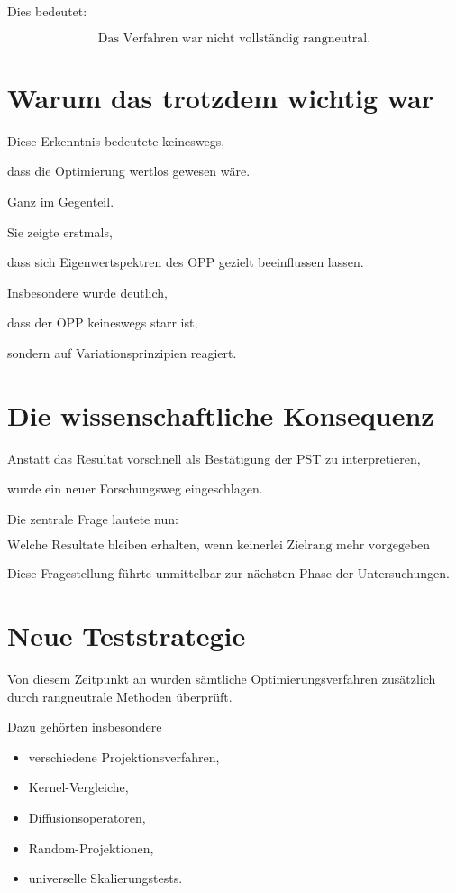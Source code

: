 Dies bedeutet:

\[
\boxed{
\text{Das Verfahren war nicht vollständig rangneutral.}
}
\]


\section*{Warum das trotzdem wichtig war}

Diese Erkenntnis bedeutete keineswegs,

dass die Optimierung wertlos gewesen wäre.

Ganz im Gegenteil.

Sie zeigte erstmals,

dass sich Eigenwertspektren des OPP gezielt beeinflussen lassen.

Insbesondere wurde deutlich,

dass der OPP keineswegs starr ist,

sondern auf Variationsprinzipien reagiert.


\section*{Die wissenschaftliche Konsequenz}

Anstatt das Resultat vorschnell als Bestätigung der PST zu interpretieren,

wurde ein neuer Forschungsweg eingeschlagen.

Die zentrale Frage lautete nun:

\[
\boxed{
\text{Welche Resultate bleiben erhalten, wenn keinerlei Zielrang mehr vorgegeben wird?}
}
\]

Diese Fragestellung führte unmittelbar zur nächsten Phase der Untersuchungen.


\section*{Neue Teststrategie}

Von diesem Zeitpunkt an wurden sämtliche Optimierungsverfahren zusätzlich durch rangneutrale Methoden überprüft.

Dazu gehörten insbesondere

\begin{itemize}

\item verschiedene Projektionsverfahren,

\item Kernel-Vergleiche,

\item Diffusionsoperatoren,

\item Random-Projektionen,

\item universelle Skalierungstests.

\end{itemize}

